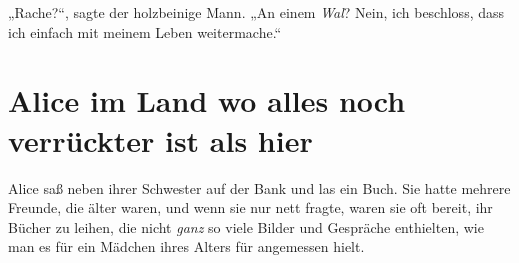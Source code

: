 „Rache?“, sagte der holzbeinige Mann.
„An einem \emph{Wal}? Nein, ich beschloss, dass ich einfach mit meinem Leben weitermache.“

\section{Alice im Land wo alles noch verrückter ist als hier\protect\footnotemark}
Alice saß neben ihrer Schwester auf der Bank und las ein Buch. Sie hatte mehrere Freunde, die älter waren, und wenn sie nur nett fragte, waren sie oft bereit, ihr Bücher zu leihen, die nicht \emph{ganz} so viele Bilder und Gespräche enthielten, wie man es für ein Mädchen ihres Alters für angemessen hielt.

